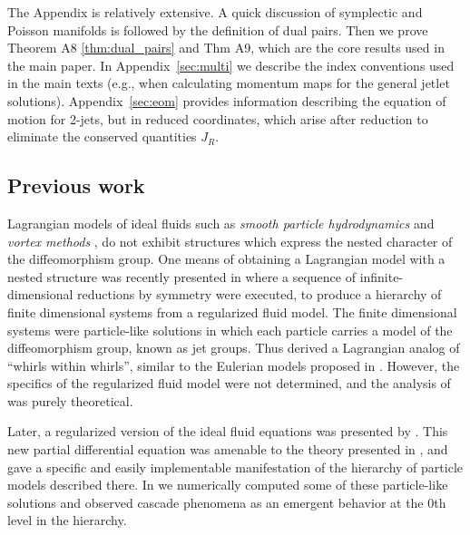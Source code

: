 \documentclass[12pt]{amsart}
\newcommand{\je}[1]{\todo[inline,color=green!20]{JE:  #1}}
\begin{document}
The Appendix is relatively extensive. A quick discussion of symplectic and Poisson manifolds is followed by the definition of dual pairs. Then we prove Theorem A8 \ref{thm:dual_pairs} and Thm A9, which are the core results used in the main paper. In Appendix~\ref{sec:multi} we describe the index conventions used in the main texts (e.g., when calculating momentum maps for the general jetlet solutions). Appendix~\ref{sec:eom} provides information describing the equation of motion for 2-jets, but in reduced coordinates, which arise after reduction to eliminate the conserved quantities $J_R$.
\je{It says 2-jets, but the appendix contains 1-jets.}

\subsection{Previous work}
  Lagrangian models of ideal fluids such as \emph{smooth particle hydrodynamics} \cite{Monaghan1977,Lucy1977} and
\emph{vortex methods} \cite{Chorin1973}, do not exhibit structures which express the nested character of the diffeomorphism group.
 One means of obtaining a Lagrangian model with a nested structure
 was recently presented in \cite{JacobsRatiuDesbrun2013}
 where a sequence of infinite-dimensional reductions by symmetry were
 executed, to produce a hierarchy of finite dimensional systems from a
 regularized fluid model.
 The finite dimensional systems were particle-like solutions
 in which each particle carries a model of the diffeomorphism group,
 known as jet groups.
 Thus \cite{JacobsRatiuDesbrun2013} derived a Lagrangian analog of 
 ``whirls within whirls'', similar to the Eulerian models proposed
 in \cite{HolmTronci2012}.
 However, the specifics of the regularized fluid model were not determined,
 and the analysis of \cite{JacobsRatiuDesbrun2013} was purely
 theoretical.
 
 Later, a regularized version of the ideal fluid equations was presented by
 \cite{MumfordMichor2013}.
 This new partial differential equation was amenable to the theory presented in 
 \cite{JacobsRatiuDesbrun2013}, and gave a specific and easily
 implementable manifestation of the hierarchy of particle models
 described there.
 In \cite{CotterHolmJacobsMeier2014} we numerically computed some
 of these particle-like solutions and observed cascade phenomena as
 an emergent behavior at the $0$th level in the hierarchy.
\end{document}
